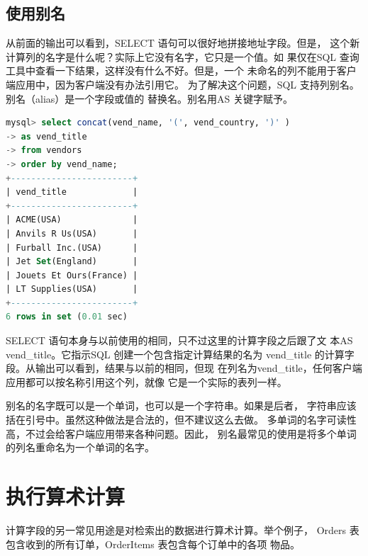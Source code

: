 \documentclass[11pt,a4paper,oneside]{book}
\begin{document}
\subsection{使用别名}
从前面的输出可以看到，SELECT 语句可以很好地拼接地址字段。但是，
这个新计算列的名字是什么呢？实际上它没有名字，它只是一个值。如
果仅在SQL 查询工具中查看一下结果，这样没有什么不好。但是，一个
未命名的列不能用于客户端应用中，因为客户端没有办法引用它。
为了解决这个问题，SQL 支持列别名。别名（alias）是一个字段或值的
替换名。别名用AS 关键字赋予。
\begin{lstlisting}[language=sql]
mysql> select concat(vend_name, '(', vend_country, ')' )
-> as vend_title
-> from vendors
-> order by vend_name;
+------------------------+
| vend_title             |
+------------------------+
| ACME(USA)              |
| Anvils R Us(USA)       |
| Furball Inc.(USA)      |
| Jet Set(England)       |
| Jouets Et Ours(France) |
| LT Supplies(USA)       |
+------------------------+
6 rows in set (0.01 sec)
\end{lstlisting}
SELECT 语句本身与以前使用的相同，只不过这里的计算字段之后跟了文
本AS vend\_title。它指示SQL 创建一个包含指定计算结果的名为
vend\_title 的计算字段。从输出可以看到，结果与以前的相同，但现
在列名为vend\_title，任何客户端应用都可以按名称引用这个列，就像
它是一个实际的表列一样。

别名的名字既可以是一个单词，也可以是一个字符串。如果是后者，
字符串应该括在引号中。虽然这种做法是合法的，但不建议这么去做。
多单词的名字可读性高，不过会给客户端应用带来各种问题。因此，
别名最常见的使用是将多个单词的列名重命名为一个单词的名字。

\section{执行算术计算}
计算字段的另一常见用途是对检索出的数据进行算术计算。举个例子，
Orders 表包含收到的所有订单，OrderItems 表包含每个订单中的各项
物品。
\end{document}
